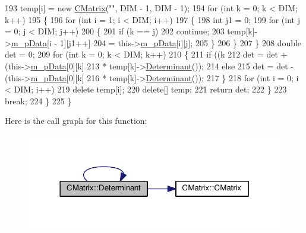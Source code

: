 \begin{DoxyCode}
193                         temp[i] = \textcolor{keyword}{new} \hyperlink{classCMatrix_a720aa6a48296f4414ac7f9021bc420c4}{CMatrix}(\textcolor{stringliteral}{""}, DIM - 1, DIM - 1);
194                     \textcolor{keywordflow}{for} (\textcolor{keywordtype}{int} k = 0; k < DIM; k++)
195                     \{
196                         \textcolor{keywordflow}{for} (\textcolor{keywordtype}{int} i = 1; i < DIM; i++)
197                         \{
198                             \textcolor{keywordtype}{int} j1 = 0;
199                             \textcolor{keywordflow}{for} (\textcolor{keywordtype}{int} j = 0; j < DIM; j++)
200                             \{
201                                 \textcolor{keywordflow}{if} (k == j)
202                                     \textcolor{keywordflow}{continue};
203                                 temp[k]->\hyperlink{classCMatrix_ab0f18d68cad9b6d750d05a96b60a759d}{m\_pData}[i - 1][j1++]
204                                         = this->\hyperlink{classCMatrix_ab0f18d68cad9b6d750d05a96b60a759d}{m\_pData}[i][j];
205                             \}
206                         \}
207                     \}
208                     \textcolor{keywordtype}{double} det = 0;
209                     \textcolor{keywordflow}{for} (\textcolor{keywordtype}{int} k = 0; k < DIM; k++)
210                     \{
211                         \textcolor{keywordflow}{if} ((k %
212                             det = det + (this->\hyperlink{classCMatrix_ab0f18d68cad9b6d750d05a96b60a759d}{m\_pData}[0][k]
213                                     * temp[k]->\hyperlink{classCMatrix_a865ff8f610be372e666fbf24d5b73a3a}{Determinant}());
214                         \textcolor{keywordflow}{else}
215                             det = det - (this->\hyperlink{classCMatrix_ab0f18d68cad9b6d750d05a96b60a759d}{m\_pData}[0][k]
216                                     * temp[k]->\hyperlink{classCMatrix_a865ff8f610be372e666fbf24d5b73a3a}{Determinant}());
217                     \}
218                     \textcolor{keywordflow}{for} (\textcolor{keywordtype}{int} i = 0; i < DIM; i++)
219                         \textcolor{keyword}{delete} temp[i];
220                     \textcolor{keyword}{delete}[] temp;
221                     \textcolor{keywordflow}{return} det;
222                 \}
223                     \textcolor{keywordflow}{break};
224             \}
225         \}
\end{DoxyCode}


Here is the call graph for this function\+:
\nopagebreak
\begin{figure}[H]
\begin{center}
\leavevmode
\includegraphics[width=318pt]{classCMatrix_a865ff8f610be372e666fbf24d5b73a3a_cgraph}
\end{center}
\end{figure}


